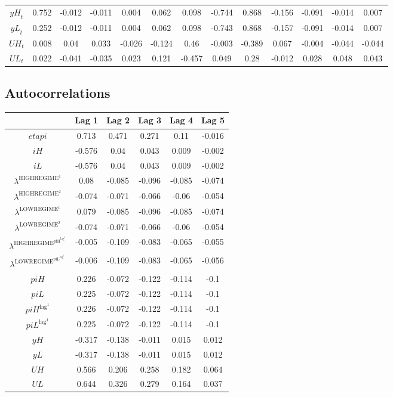 \begin{tabular}{c|c|c|c|c|c|c|c|c|c|c|c|c|}
${y\!H}_{t}$ & 0.752 & -0.012 & -0.011 & 0.004 & 0.062 & 0.098 & -0.744 & 0.868 & -0.156 & -0.091 & -0.014 & 0.007 \\
${y\!L}_{t}$ & 0.252 & -0.012 & -0.011 & 0.004 & 0.062 & 0.098 & -0.743 & 0.868 & -0.157 & -0.091 & -0.014 & 0.007 \\
${U\!H}_{t}$ & 0.008 & 0.04 & 0.033 & -0.026 & -0.124 & 0.46 & -0.003 & -0.389 & 0.067 & -0.004 & -0.044 & -0.044 \\
${U\!L}_{t}$ & 0.022 & -0.041 & -0.035 & 0.023 & 0.121 & -0.457 & 0.049 & 0.28 & -0.012 & 0.028 & 0.048 & 0.043 \\
\hline
\end{tabular}


\subsection{Autocorrelations}

\begin{tabular}{c|ccccc|}
  & Lag 1 & Lag 2 & Lag 3 & Lag 4 & Lag 5\\
\hline
${e\!t\!a\!p\!i}$ & 0.713 & 0.471 & 0.271 & 0.11 & -0.016 \\
${i\!H}$ & -0.576 & 0.04 & 0.043 & 0.009 & -0.002 \\
${i\!L}$ & -0.576 & 0.04 & 0.043 & 0.009 & -0.002 \\
$\lambda^{\mathrm{HIGHREGIME}^{\mathrm{1}}}$ & 0.08 & -0.085 & -0.096 & -0.085 & -0.074 \\
$\lambda^{\mathrm{HIGHREGIME}^{\mathrm{2}}}$ & -0.074 & -0.071 & -0.066 & -0.06 & -0.054 \\
$\lambda^{\mathrm{LOWREGIME}^{\mathrm{1}}}$ & 0.079 & -0.085 & -0.096 & -0.085 & -0.074 \\
$\lambda^{\mathrm{LOWREGIME}^{\mathrm{2}}}$ & -0.074 & -0.071 & -0.066 & -0.06 & -0.054 \\
$\lambda^{\mathrm{HIGHREGIME}^{\mathrm{piH}^{\mathrm{lag}^{\mathrm{1}}}}}$ & -0.005 & -0.109 & -0.083 & -0.065 & -0.055 \\
$\lambda^{\mathrm{LOWREGIME}^{\mathrm{piL}^{\mathrm{lag}^{\mathrm{1}}}}}$ & -0.006 & -0.109 & -0.083 & -0.065 & -0.056 \\
${p\!i\!H}$ & 0.226 & -0.072 & -0.122 & -0.114 & -0.1 \\
${p\!i\!L}$ & 0.225 & -0.072 & -0.122 & -0.114 & -0.1 \\
${p\!i\!H}^{\mathrm{lag}^{\mathrm{1}}}$ & 0.226 & -0.072 & -0.122 & -0.114 & -0.1 \\
${p\!i\!L}^{\mathrm{lag}^{\mathrm{1}}}$ & 0.225 & -0.072 & -0.122 & -0.114 & -0.1 \\
${y\!H}$ & -0.317 & -0.138 & -0.011 & 0.015 & 0.012 \\
${y\!L}$ & -0.317 & -0.138 & -0.011 & 0.015 & 0.012 \\
${U\!H}$ & 0.566 & 0.206 & 0.258 & 0.182 & 0.064 \\
${U\!L}$ & 0.644 & 0.326 & 0.279 & 0.164 & 0.037 \\
\hline
\end{tabular}



